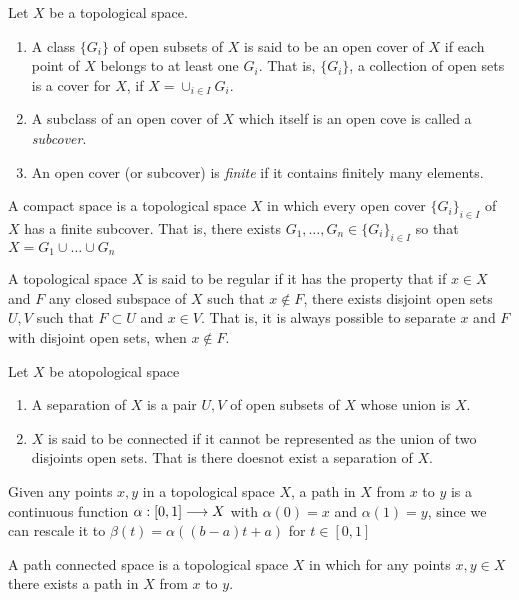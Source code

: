 \begin{defn} 
    Let $X$ be a topological space.
    \begin{enumerate}
        \item A class $\{G_i\}$ of open subsets of $X$ is said to be an open cover of $X$ if each point of $X$ belongs to at least one $G_i$. That is, $\{G_i\}$, a collection of open sets is a cover for $X$, if $X = \cup_{i \in I} G_i$.
        \item A subclass of an open cover of $X$ which itself is an open cove is called a \textit{subcover}.
        \item An open cover (or subcover) is \textit{finite} if it contains finitely many elements. 
    \end{enumerate}
\end{defn}

\begin{defn}
    A compact space is a topological space $X$ in which every open cover $\{G_i\}_{i \in I}$ of $X$ has a finite subcover. That is, there exists $G_1, \ldots, G_n \in \{G_i\}_{i \in I}$ so that $X  = G_1 \cup \ldots \cup G_n$ 
\end{defn}

\begin{defn}
    A topological space $X$ is said to be regular if it has the property that if $x \in X$ and $F$ any closed subspace of $X$ such that $x \notin F$, there exists disjoint open sets $U,V$ such that $F \subset U$ and $x \in V$. That is, it is always possible to separate $x$ and $F$ with disjoint open sets, when $x \notin F$.
\end{defn}

\begin{defn}
    Let $X$ be atopological space 
    \begin{enumerate}
        \item A separation of $X$ is a pair $U,V$ of open subsets of $X$ whose union is $X$.
        \item $X$ is said to be connected if it cannot be represented as the union of two disjoints open sets. That is there doesnot exist a separation of $X$.
    \end{enumerate}
\end{defn}

\begin{defn}[Path]
    Given any points $x,y$ in a topological space $X$, a path in $X$ from $x$ to $y$ is a continuous function $\alpha : [0,1] \longrightarrow X$ with $\alpha(0) = x$ and $\alpha(1) = y$, since we can rescale it to $\beta(t) = \alpha((b-a)t + a)$ for $t \in [0,1]$
\end{defn}
\begin{defn}
    A path connected space is a topological space $X$ in which for any points $x,y \in X$ there exists a path in $X$ from $x$ to $y$.
\end{defn}

